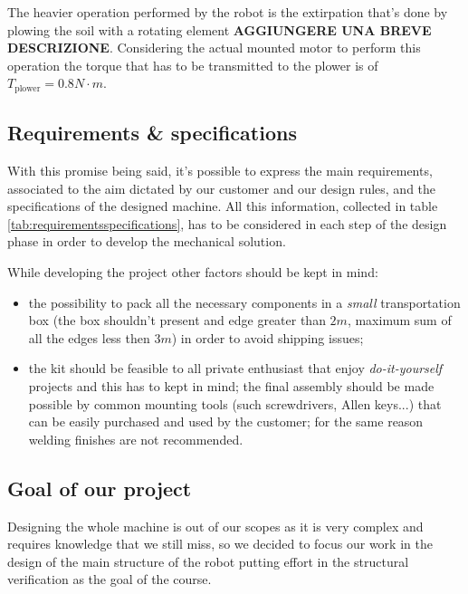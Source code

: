 	The heavier operation performed by the robot is the extirpation that's done by plowing the soil with a rotating element \textbf{AGGIUNGERE UNA BREVE DESCRIZIONE}. Considering the actual mounted motor to perform this operation the torque that has to be transmitted to the plower is of $T_\textrm{plower} = 0.8 N\cdot m$.

	
	\subsection{Requirements \& specifications}
		With this promise being said, it's possible to express the main requirements, associated to the aim dictated by our customer and our design rules, and the specifications of the designed machine. All this information, collected in table \ref{tab:requirementsspecifications}, has to be considered in each step of the design phase in order to develop the mechanical solution.
		
		
		
		While developing the project other factors should be kept in mind:
		\begin{itemize}
			\item the possibility to pack all the necessary components in a \textit{small} transportation box (the box shouldn't present and edge greater than $2m$, maximum sum of all the edges less then $3m$) in order to avoid shipping issues;
			
			\item the kit should be feasible to all private enthusiast that enjoy \textit{do-it-yourself} projects and this has to kept in mind; the final assembly should be made possible by common mounting tools (such screwdrivers, Allen keys...) that can be easily purchased and used by the customer; for the same reason welding finishes are not recommended.
		\end{itemize}
	
	\subsection{Goal of our project}
		Designing the whole machine is out of our scopes as it is very complex and requires knowledge that we still miss, so we decided to focus our work in the design of the main structure of the robot putting effort in the structural verification as the goal of the course.
	
	
	
	
	
	
	
	
	
	
	
	
	
	
	
	
	
	
	
	
	
	
	